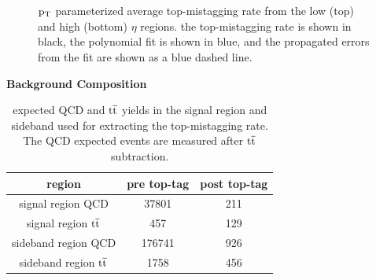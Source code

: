 \begin{figure}[htcb]
\begin{center}
\\
\\
\caption{
$\mathrm{p_{T}}$ parameterized average top-mistagging rate from the low (top) and high (bottom) $\eta$ regions. 
the top-mistagging rate is shown in black, the polynomial fit is shown in blue, and the propagated errors from the fit are shown as a blue dashed line.}
\label{figs:bstagrateetafit}
\end{center}
\end{figure}



\begin{table}
\begin{center}
\bf{Background Composition}\\
\begin{tabular}{|c||c|c|}
\hline
\bf{region} & \bf{pre top-tag}  & \bf{post top-tag} \\
\hline
signal region QCD & 37801  & 211 \\
\hline
signal region $\mathrm{t\overline{t}}$ & 457 & 129 \\
\hline
sideband region QCD & 176741 & 926 \\
\hline
sideband region $\mathrm{t\overline{t}}$ & 1758 & 456 \\
\hline
\end{tabular}
\end{center}
\caption{expected QCD and $\mathrm{t\overline{t}}$ yields in the signal region and sideband used for extracting the top-mistagging rate.  The QCD expected events are measured after $\mathrm{t\overline{t}}$ subtraction.}
\label{table:bsbkgcomp}
\end{table}


